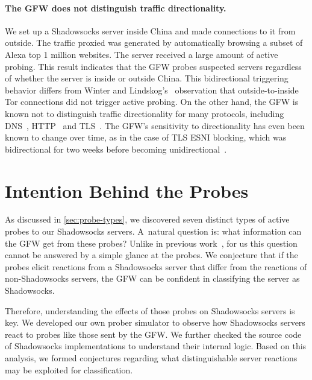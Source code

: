\documentclass[sigconf,letterpaper]{acmart}
\begin{document}
\paragraph{The GFW does not distinguish traffic directionality.}
We set up a Shadowsocks server inside China and made connections to it from outside.
The traffic proxied was generated by automatically browsing a subset of Alexa top 1 million websites.
The server received a large amount of active probing.
This result indicates that the GFW probes suspected servers
regardless of whether the server is inside or outside China.
This bidirectional triggering behavior differs from Winter and Lindskog's~\cite[\S 4.4]{Winter2012a} observation
that outside-to-inside Tor connections did not trigger active probing.
On the other hand,
the GFW is known not to distinguish traffic directionality for many protocols,
including DNS~\cite[\S 2]{Anonymous2014a}, HTTP~\cite[\S 3]{Clayton2006a} and TLS~\cite[\S 3.1]{Chai2019a}.
The GFW's sensitivity to directionality has even been known to change over time,
as in the case of TLS ESNI blocking, which was bidirectional for two weeks
before becoming unidirectional~\cite{Bock2020ESNI}.


\section{Intention Behind the Probes}
\label{sec:intention}

As discussed in \autoref{sec:probe-types},
we discovered seven distinct types of active probes to our Shadowsocks servers.
A~natural question is: what information can the GFW get from these probes?
Unlike in previous work~\cite{Ensafi2015b, Winter2012a},
for us this question cannot be answered by a simple glance at the probes.
We conjecture that if the probes elicit reactions from a Shadowsocks server
that differ from the reactions of non-Shadowsocks servers,
the GFW can be confident in classifying the server as Shadowsocks.

Therefore, understanding the effects of those probes on Shadowsocks servers is key.
We developed our own prober simulator
to observe how Shadowsocks servers react to probes like those sent by the GFW.
We further checked the source code of Shadowsocks implementations to understand their internal logic.
Based on this analysis,
we formed conjectures regarding what distinguishable server reactions
may be exploited for classification.
\end{document}
